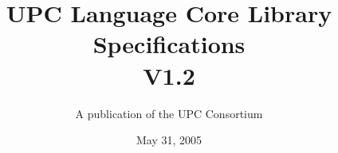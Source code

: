 

\makeindex

\title{UPC Language Core Library Specifications\\
V1.2 }

\author{A publication of the UPC Consortium}

\date {May 31, 2005}



\maketitle

\setcounter{page}{2}


\newpage
\setlength {\parskip}{0ex}
\tableofcontents                                             
\setlength {\parskip}{1.3ex}
\newpage








\pagebreak
\printindex

